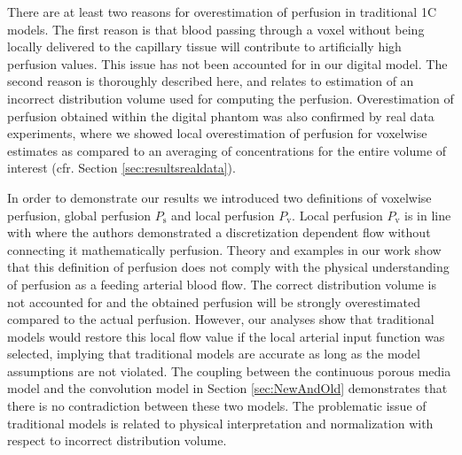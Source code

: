 \documentclass[final,5p,times,twocolumn]{elsarticle}
\begin{document}
	There are at least two reasons for overestimation of perfusion in traditional 1C models. The first reason is that blood passing through a voxel without being locally delivered to the capillary tissue will contribute to artificially high perfusion values. This issue has not been accounted for in our digital model. The second reason is thoroughly described here, and relates to estimation of an incorrect distribution volume used for computing the perfusion. 
	Overestimation of perfusion obtained within the digital phantom was also confirmed by real data experiments, where we showed local overestimation of perfusion for voxelwise estimates as compared to an averaging of concentrations for the entire volume of interest (cfr. Section \ref{sec:resultsrealdata}). 
	
	In order to demonstrate our results we introduced two definitions of voxelwise perfusion, global perfusion $P_{\mathrm{s}}$ and local perfusion $P_{\mathrm{v}}$. Local perfusion $P_{\mathrm{v}}$ is in line with \cite{Guibert2013} where the authors demonstrated a discretization dependent flow without connecting it mathematically perfusion. Theory and examples in our work show that this definition of perfusion does not comply with the physical understanding of perfusion as a feeding arterial blood flow. The correct distribution volume is not accounted for and the obtained perfusion will be strongly overestimated compared to the actual perfusion. However, our analyses show that traditional models would restore this local flow value if the local arterial input function was selected, implying that traditional models are accurate as long as the model assumptions are not violated. The coupling between the continuous porous media model and the convolution model in Section \ref{sec:NewAndOld} demonstrates that there is no contradiction between these two models. The problematic issue of traditional models is related to physical interpretation and normalization with respect to incorrect distribution volume.
\end{document}
